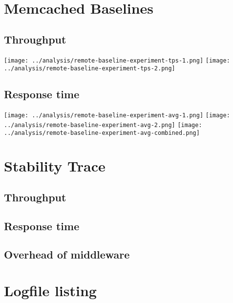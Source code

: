 \documentclass[11pt]{article}
\begin{document}
\section{Memcached Baselines}\label{sec:baseline}


\subsection{Throughput}\label{sec:baseline:tput}

\texttt{[image: ../analysis/remote-baseline-experiment-tps-1.png]}
\texttt{[image: ../analysis/remote-baseline-experiment-tps-2.png]}

\subsection{Response time}\label{sec:baseline:rt}

\texttt{[image: ../analysis/remote-baseline-experiment-avg-1.png]}
\texttt{[image: ../analysis/remote-baseline-experiment-avg-2.png]}
\texttt{[image: ../analysis/remote-baseline-experiment-avg-combined.png]}

\section{Stability Trace}\label{sec:trace}


\subsection{Throughput}

\subsection{Response time}

\subsection{Overhead of middleware}



\pagebreak

\section*{Logfile listing}
\end{document}
